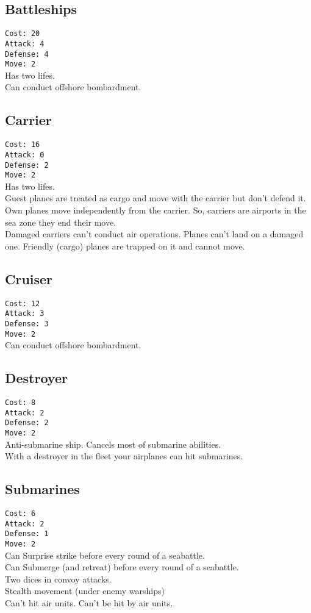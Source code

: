 \documentclass[10pt,a4paper,landscape]{article}
\begin{document}
\begin{multicols*}{3}
\subsection*{Battleships}
\texttt{Cost: 20 \\ Attack: 4 \\ Defense: 4 \\ Move: 2}
\\
Has two lifes.\\
Can conduct offshore bombardment.

\subsection*{Carrier}
\texttt{Cost: 16 \\ Attack: 0 \\ Defense: 2 \\ Move: 2}
\\
Has two lifes.\\
Guest planes are treated as cargo and move with the carrier but don't defend it. Own planes move independently from the carrier. So, carriers are airports in the sea zone they end their move.\\
Damaged carriers can't conduct air operations. Planes can't land on a damaged one. Friendly (cargo) planes are trapped on it and cannot move.

\subsection*{Cruiser}
\texttt{Cost: 12 \\ Attack: 3 \\ Defense: 3 \\ Move: 2}
\\
Can conduct offshore bombardment.

\subsection*{Destroyer}
\texttt{Cost: 8 \\ Attack: 2 \\ Defense: 2 \\ Move: 2}
\\
Anti-submarine ship. Cancels most of submarine abilities.\\
With a destroyer in the fleet your airplanes can hit submarines.

\subsection*{Submarines}
\texttt{Cost: 6 \\ Attack: 2 \\ Defense: 1 \\ Move: 2}
\\
Can Surprise strike before every round of a seabattle.\\
Can Submerge (and retreat) before every round of a seabattle.\\
Two dices in convoy attacks.\\
Stealth movement (under enemy warships)\\
Can't hit air units. Can't be hit by air units.



\end{multicols*}
\end{document}
